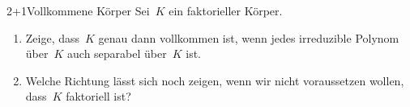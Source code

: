 \documentclass{algblatt}
\begin{document}
\begin{aufgabe}{2+1}{Vollkommene Körper}
Sei~$K$ ein faktorieller Körper.
\begin{enumerate}
\item Zeige, dass~$K$ genau dann vollkommen ist, wenn jedes irreduzible Polynom
über~$K$ auch separabel über~$K$ ist.
\item Welche Richtung lässt sich noch zeigen, wenn wir nicht voraussetzen
wollen, dass~$K$ faktoriell
ist?
\end{enumerate}
\end{aufgabe}
\end{document}

